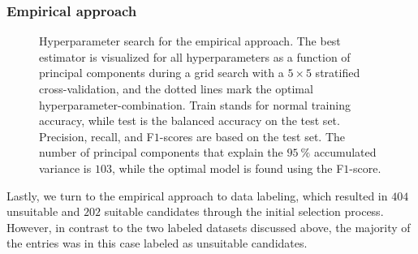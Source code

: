 \documentclass[superscriptaddress,unsortedaddress,
 amsmath,amssymb,
 aps,
]{revtex4-2}
\begin{document}
\subsubsection*{Empirical approach}

\begin{figure}[ht!]
  \begin{subfigure}[b]{1.0\textwidth}
    \centering
    
  \end{subfigure}
  \par\bigskip
  \begin{subfigure}[b]{0.5\textwidth}
    
    \caption{}
    \label{fig:q3-LOG}
  \end{subfigure}%
  \hfill
  \begin{subfigure}[b]{0.5\textwidth}
    
    \caption{}
    \label{fig:q3-DT}
  \end{subfigure}
  \begin{subfigure}[b]{0.5\textwidth}
    
    \caption{}
    \label{fig:q3-RF}
  \end{subfigure}%
  \hfill
  \begin{subfigure}[b]{0.5\textwidth}
    
    \caption{}
    \label{fig:q3-GB}
  \end{subfigure}

  \caption{{Hyperparameter search for the empirical approach. The best estimator is visualized for all hyperparameters as a function of principal components during a grid search with a $5\times5$ stratified cross-validation, and the dotted lines mark the optimal hyperparameter-combination. Train stands for normal training accuracy, while test is the balanced accuracy on the test set. Precision, recall, and F$1$-scores are based on the test set. The number of principal components that explain the $95 \ \%$ accumulated variance is $103$, while the optimal model is found using the F$1$-score.}}
  \label{fig:03-pca}
\end{figure}

Lastly, we turn to the empirical approach to data labeling, which resulted in $404$ unsuitable and $202$ suitable candidates through the initial selection process. However, in contrast to the two labeled datasets discussed above, the majority of the entries was in this case labeled as unsuitable candidates. 
\end{document}
